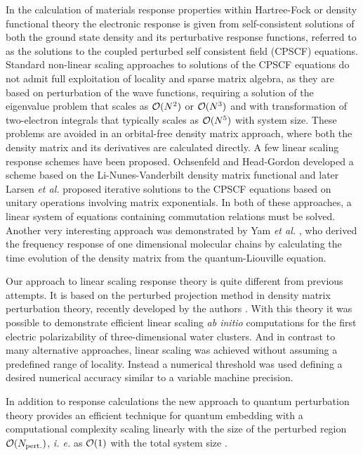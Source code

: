 \documentclass[prl,aps,letterpaper,twocolumn,showpacs,twocolumngrid,superbib]{revtex4}
\begin{document}
 In the calculation of materials response properties within 
 Hartree-Fock or density functional theory the electronic
 response is given from self-consistent solutions of both
 the ground state density and its perturbative response functions,
 referred to as the solutions to the coupled perturbed self consistent 
 field (CPSCF) equations.
 Standard non-linear scaling approaches to solutions of the CPSCF equations 
 \cite{Pople_1979,Sekino_1986,Dupuis_1991} do not admit full exploitation 
 of locality and sparse matrix algebra, as they are based on perturbation 
 of the wave functions, requiring a solution of the eigenvalue problem
 that scales as ${\cal O}(N^2)$ or ${\cal O}(N^3)$ and with transformation of two-electron
 integrals that typically scales as ${\cal O}(N^5)$ with system size.
 These problems are avoided in an orbital-free density matrix approach, 
 where both the density matrix and its derivatives are calculated directly.
 A few linear scaling response schemes have been proposed.
 Ochsenfeld and Head-Gordon developed a scheme based on the
 Li-Nunes-Vanderbilt density matrix functional \cite{Ochsenfeld97}
 and later Larsen {\em et al.} \cite{Helgaker_2001} proposed iterative 
 solutions to the CPSCF equations based on unitary operations
 involving matrix exponentials. In both of these approaches, a linear 
 system of equations containing commutation relations must be solved.
 Another very interesting approach was demonstrated by Yam {\em et al.}
 \cite{CYam03,CYam03a}, who derived the frequency response of one 
 dimensional molecular chains by calculating the time evolution of 
 the density matrix from the quantum-Liouville equation.

 Our approach to linear scaling response theory is quite different 
 from previous attempts. It is based on the perturbed projection
 method in density matrix perturbation theory, recently developed
 by the authors \cite{ANiklasson04,Weber04}. With this theory it
 was possible to demonstrate efficient linear scaling {\em ab initio}
 computations for the first electric polarizability of three-dimensional 
 water clusters. And in contrast to many alternative approaches, linear scaling 
 was achieved without assuming a predefined range of locality. Instead a 
 numerical threshold was used defining a desired numerical accuracy similar
 to a variable machine precision.

 In addition to response calculations the new approach to quantum perturbation
 theory provides an efficient technique for quantum embedding with a computational
 complexity scaling linearly with the size of the perturbed region ${\cal O}(N_{\rm pert.})$,
 {\em i. e.} as ${\cal O}(1)$ with the total system size \cite{ANiklasson04}.
\end{document}
